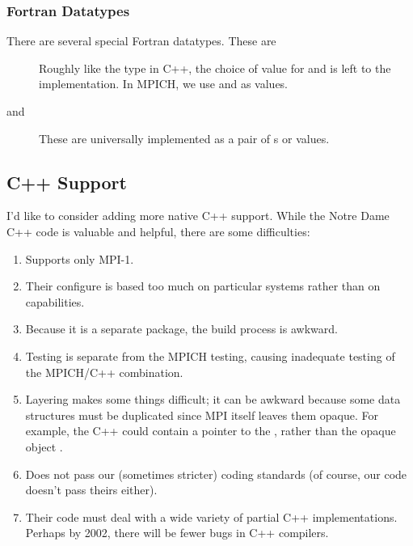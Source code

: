 \documentclass{article}
\begin{document}
\subsubsection{Fortran Datatypes}
There are several special Fortran datatypes.  These are
\begin{description}
\item[]Roughly like the  type in C++, the choice of
  value for  and  is left to the implementation.
  In MPICH, we use  and  as values.
\item[ and ]These are universally implemented
  as a pair of s or  values.
\end{description}

\subsection{C++ Support}
\label{sec:c++}
I'd like to consider adding more native C++ support.  While the Notre
Dame C++ code is valuable and helpful, there are some difficulties:
\begin{enumerate}
\item Supports only MPI-1.

\item Their configure is based too much on particular systems rather than on
capabilities. 

\item Because it is a separate package, the build process is awkward.

\item Testing is separate from the MPICH testing, causing inadequate
testing of the MPICH/C++ combination.

\item Layering makes some things difficult; it can be awkward because
some data structures must be duplicated since MPI itself leaves them
opaque.  For example, the C++  could contain a pointer to the
, rather than the opaque object .

\item Does not pass our (sometimes stricter) coding standards (of course, our
  code doesn't pass theirs either).

\item Their code must deal with a wide variety of partial C++
implementations.  Perhaps by 2002, there will be fewer bugs in C++ compilers.
\end{enumerate}
\end{document}
